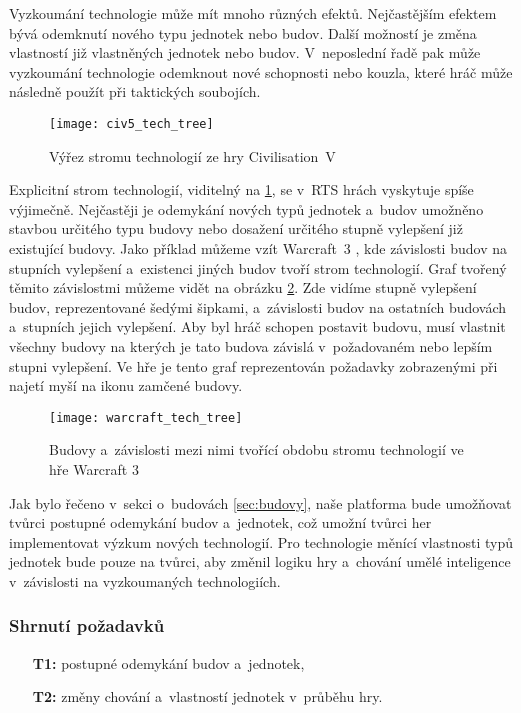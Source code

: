 Vyzkoumání technologie může mít mnoho různých efektů. Nejčastějším efektem bývá odemknutí nového typu jednotek nebo budov. Další možností je změna vlastností již vlastněných jednotek nebo budov. V~neposlední řadě pak může vyzkoumání technologie odemknout nové schopnosti nebo kouzla, které hráč může následně použít při taktických soubojích. 

\begin{figure}[h]	
	\centering
	\texttt{[image: civ5\_tech\_tree]}
	\caption{Výřez stromu technologií ze hry Civilisation~V \citep{site:civ5}}
	\label{fig:civ5techtree}
\end{figure}


Explicitní strom technologií, viditelný na \ref{fig:civ5techtree}, se v~RTS hrách vyskytuje spíše výjimečně. Nejčastěji je odemykání nových typů jednotek a~budov umožněno stavbou určitého typu budovy nebo dosažení určitého stupně vylepšení již existující budovy. Jako příklad můžeme vzít Warcraft~3 \citep{site:warcraft3}, kde závislosti budov na stupních vylepšení a~existenci jiných budov tvoří strom technologií. Graf tvořený těmito závislostmi můžeme vidět na obrázku \ref{fig:warcrafttechtree}. Zde vidíme stupně vylepšení budov, reprezentované šedými šipkami, a~závislosti budov na ostatních budovách a~stupních jejich vylepšení. Aby byl hráč schopen postavit budovu, musí vlastnit všechny budovy na kterých je tato budova závislá v~požadovaném nebo lepším stupni vylepšení. Ve hře je tento graf reprezentován požadavky zobrazenými při najetí myší na ikonu zamčené budovy.

\begin{figure}[h]	
	\centering
	\texttt{[image: warcraft\_tech\_tree]}
	\caption{Budovy a~závislosti mezi nimi tvořící obdobu stromu technologií ve hře Warcraft 3}
	\label{fig:warcrafttechtree}
\end{figure}

Jak bylo řečeno v~sekci o~budovách \ref{sec:budovy}, naše platforma bude umožňovat tvůrci postupné odemykání budov a~jednotek, což umožní tvůrci her implementovat výzkum nových technologií. Pro technologie měnící vlastnosti typů jednotek bude pouze na tvůrci, aby změnil logiku hry a~chování umělé inteligence v~závislosti na vyzkoumaných technologiích.

\subsubsection{Shrnutí požadavků}
\label{sec:requirements}

\begin{itemize}
	\item[\textbf{T1:}] postupné odemykání budov a~jednotek,
	\item[\textbf{T2:}] změny chování a~vlastností jednotek v~průběhu hry.
\end{itemize}

